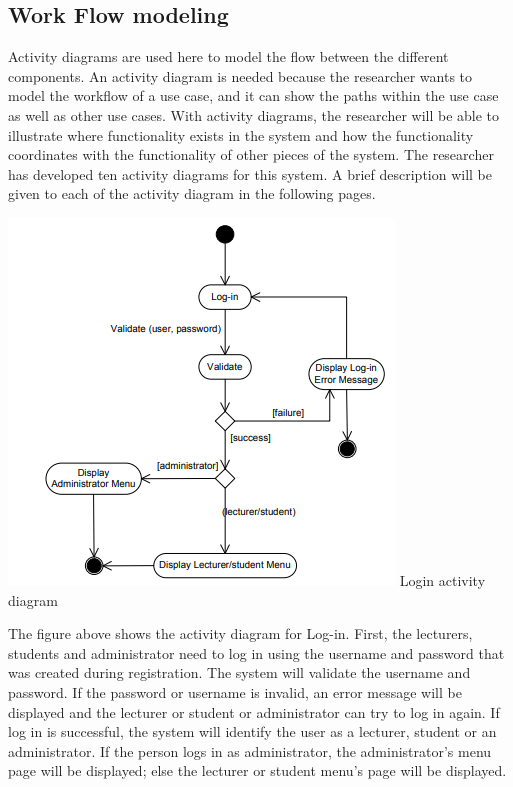 \documentclass{scrreprt}
\begin{document}
\subsection {Work Flow  modeling}
Activity diagrams are used here to model the flow between the different components.
An activity diagram is needed because the researcher wants to model the workflow of a
use case, and it can show the paths within the use case as well as other use cases. With
activity diagrams, the researcher will be able to illustrate where functionality exists in
the system and how the functionality coordinates with the functionality of other pieces
of the system. The researcher has developed ten activity diagrams for this system. A
brief description will be given to each of the activity diagram in the following pages. 
\begin{center}
\includegraphics[scale=0.8]{login.png}
Login activity diagram

\end{center}
The figure above shows the activity diagram for Log-in. First, the lecturers, students and
administrator need to log in using the username and password that was created during
registration. The system will validate the username and password. If the password or
username is invalid, an error message will be displayed and the lecturer or student or
administrator can try to log in again. If log in is successful, the system will identify the
user as a lecturer, student or an administrator. If the person logs in as administrator, the
administrator’s menu page will be displayed; else the lecturer or student menu’s page
will be displayed. 
\end{document}
